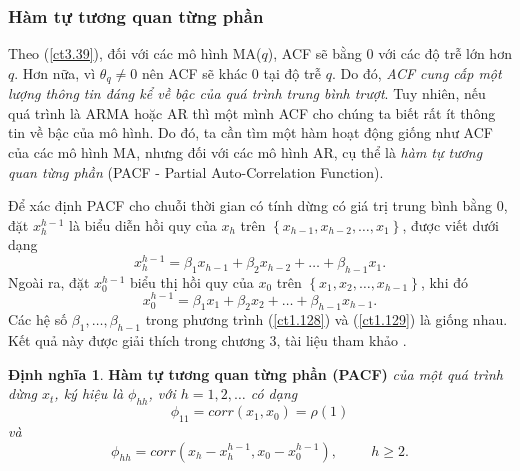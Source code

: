 \documentclass[12pt, a4paper,oneside]{book}
\theoremstyle{definition}
\newtheorem{dn}[theo]{Định nghĩa}
\begin{document}
\subsubsection*{Hàm tự tương quan từng phần}
Theo (\ref{ct3.39}), đối với các mô hình MA($q$), ACF sẽ bằng $0$ với các độ trễ lớn hơn $q$. Hơn nữa, vì $\theta_q\neq0$ nên ACF sẽ khác $0$ tại độ trễ $q$. Do đó, \textit{ACF cung cấp một lượng thông tin đáng kể về bậc của quá trình trung bình trượt}. Tuy nhiên, nếu quá trình là ARMA hoặc AR thì một mình ACF cho chúng ta biết rất ít thông tin về bậc của mô hình. Do đó, ta cần tìm một hàm hoạt động giống như ACF của các mô hình MA, nhưng đối với các mô hình AR, cụ thể là \textit{hàm tự tương quan từng phần} (PACF - Partial Auto-Correlation Function).

Để xác định PACF cho chuỗi thời gian có tính dừng có giá trị trung bình bằng $0$, đặt $x_h^{h-1}$ là biểu diễn hồi quy của $x_{h}$ trên $\left\lbrace x_{h-1}, x_{h-2}, \dots, x_{1}\right\rbrace$, được viết dưới dạng
\begin{equation}
x_h^{h-1}= \beta_{1}x_{h-1}+ \beta_{2}x_{h-2}+ \dots+ \beta_{h-1}x_{1}. \label{ct1.128}
\end{equation}
Ngoài ra, đặt $x_0^{h-1}$ biểu thị hồi quy của $x_{0}$ trên $\left\lbrace x_{1}, x_{2}, \dots, x_{h-1}\right\rbrace$, khi đó 
\begin{equation}
x_0^{h-1} = \beta_{1}x_{1}+\beta_{2}x_{2}+ \dots+ \beta_{h-1}x_{h-1}. \label{ct1.129}
\end{equation}
Các hệ số $\beta_{1}, \dots, \beta_{h-1}$ trong phương trình (\ref{ct1.128}) và (\ref{ct1.129}) là giống nhau. Kết quả này được giải thích trong chương 3, tài liệu tham khảo \cite{8}.

\begin{dn}\cite{8} \textbf{Hàm tự tương quan từng phần (PACF)}\textit{ của một quá trình dừng $x_{t}$, ký hiệu là $\phi_{hh}$, với $h=1, 2, \dots$ có dạng
		\begin{equation}
		\phi_{11}=corr(x_{1}, x_{0})=\rho(1) \label{ct1.130}
		\end{equation}	
		và 
		\begin{equation}
		\phi_{hh} = corr(x_{h}-x_h^{h-1}, x_{0}-x_0^{h-1}), \hspace{1cm} h \geq 2. \label{ct1.131}	
		\end{equation}}
\end{dn}
\end{document}
